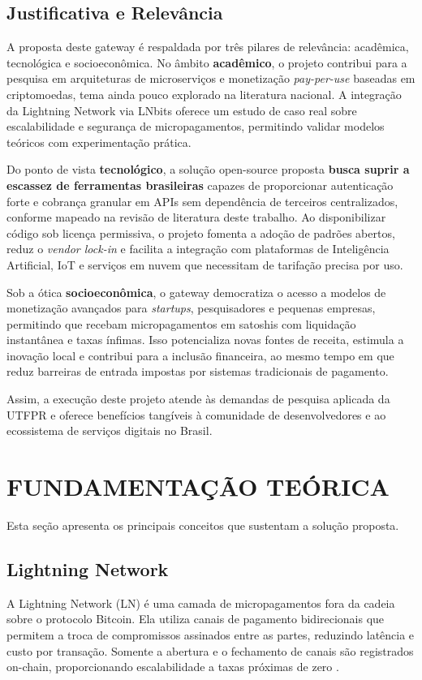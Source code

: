\documentclass[openright]{normas-utf-tex}
\begin{document}
\section{Justificativa e Relevância}
A proposta deste gateway é respaldada por três pilares de relevância: acadêmica, tecnológica e socioeconômica. No âmbito \textbf{acadêmico}, o projeto contribui para a pesquisa em arquiteturas de microserviços e monetização \textit{pay-per-use} baseadas em criptomoedas, tema ainda pouco explorado na literatura nacional. A integração da Lightning Network via LNbits oferece um estudo de caso real sobre escalabilidade e segurança de micropagamentos, permitindo validar modelos teóricos com experimentação prática.

Do ponto de vista \textbf{tecnológico}, a solução open-source proposta \textbf{busca suprir a escassez de ferramentas brasileiras} capazes de proporcionar autenticação forte e cobrança granular em APIs sem dependência de terceiros centralizados, conforme mapeado na revisão de literatura deste trabalho. Ao disponibilizar código sob licença permissiva, o projeto fomenta a adoção de padrões abertos, reduz o \textit{vendor lock-in} e facilita a integração com plataformas de Inteligência Artificial, IoT e serviços em nuvem que necessitam de tarifação precisa por uso.


Sob a ótica \textbf{socioeconômica}, o gateway democratiza o acesso a modelos de monetização avançados para \textit{startups}, pesquisadores e pequenas empresas, permitindo que recebam micropagamentos em satoshis com liquidação instantânea e taxas ínfimas. Isso potencializa novas fontes de receita, estimula a inovação local e contribui para a inclusão financeira, ao mesmo tempo em que reduz barreiras de entrada impostas por sistemas tradicionais de pagamento.

Assim, a execução deste projeto atende às demandas de pesquisa aplicada da UTFPR e oferece benefícios tangíveis à comunidade de desenvolvedores e ao ecossistema de serviços digitais no Brasil.

\chapter{FUNDAMENTAÇÃO TEÓRICA}

Esta seção apresenta os principais conceitos que sustentam a solução proposta.

\section{Lightning Network}
A Lightning Network (LN) é uma camada de micropagamentos fora da cadeia sobre o protocolo Bitcoin. Ela utiliza canais de pagamento bidirecionais que permitem a troca de compromissos assinados entre as partes, reduzindo latência e custo por transação. Somente a abertura e o fechamento de canais são registrados on-chain, proporcionando escalabilidade a taxas próximas de zero \cite{poon2016lightning}.
\end{document}
